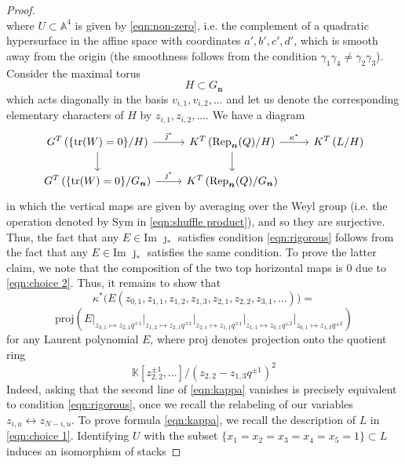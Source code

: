 \documentclass{amsart}
\def\BA{{\mathbb{A}}}
\def\BK{{\mathbb{K}}}
\def\bn{{\boldsymbol{n}}}
\begin{document}
\begin{proof}
\begin{equation}
\end{equation} 
where $U \subset \BA^4$ is given by \eqref{eqn:non-zero}, i.e. the complement of a quadratic hypersurface in the affine space with coordinates $a',b',c',d'$, which is smooth away from the origin (the smoothness follows from the condition $\gamma_1\gamma_4 \neq \gamma_2\gamma_3$). Consider the maximal torus
\[
H \subset G_{\bn}
\]
which acts diagonally in the basis $v_{i,1},v_{i,2},\dots$ and let us denote the corresponding elementary characters of $H$ by $z_{i,1},z_{i,2},\dots$. We have a diagram
\[
\begin{tikzcd}
G^T \left(\{\text{tr}(W) = 0\}/H \right) \arrow[d] \arrow[r,"\bar{\jmath}^*"]  & K^T \left(\text{Rep}_{\bn}(Q)/H \right) \arrow[d] \arrow[r,"\kappa^*"] & K^T \left(L/H \right) \\ 
G^T \left(\{\text{tr}(W) = 0\}/G_{\bn} \right) \arrow[r,"\jmath^*"] & K^T \left(\text{Rep}_{\bn}(Q)/G_{\bn} \right)  & 
\end{tikzcd}
\]
in which the vertical maps are given by averaging over the Weyl group (i.e. the operation denoted by $\text{Sym}$ in \eqref{eqn:shuffle product}), and so they are surjective. Thus, the fact that any $E \in \text{Im }\jmath_*$ satisfies condition \eqref{eqn:rigorous} follows from the fact that any $E \in \text{Im }\bar{\jmath}_*$ satisfies the same condition. To prove the latter claim, we note that the composition of the two top horizontal maps is $0$ due to \eqref{eqn:choice 2}. Thus, it remains to show that
\begin{equation}
\label{eqn:kappa}
\kappa^*\Big(E(z_{0,1},z_{1,1},z_{1,2},z_{1,3},z_{2,1},z_{2,2},z_{3,1},\dots )\Big) = 
\end{equation} 
\[
\text{proj} \left( E\Big|_{z_{3,1} \mapsto z_{2,1}q^{\mp 1}} \Big|_{z_{1,2} \mapsto z_{2,1}q^{\mp 1}} \Big|_{z_{2,1} \mapsto z_{1,1} q^{\mp 1}} \Big|_{z_{1,1} \mapsto z_{0,1} q^{\pm 2}} \Big|_{z_{0,1} \mapsto z_{1,3} q^{\pm 2}} \right)
\]
for any Laurent polynomial $E$, where $\text{proj}$ denotes projection onto the quotient ring
\begin{equation}
\label{eqn:quotient}
\BK[z_{2,2}^{\pm 1},\dots] \Big/ (z_{2,2} - z_{1,3} q^{\pm 1})^2
\end{equation}
Indeed, asking that the second line of \eqref{eqn:kappa} vanishes is precisely equivalent to condition \eqref{eqn:rigorous}, once we recall the relabeling of our variables $z_{i,u} \leftrightarrow z_{N-i,u}$. To prove formula \eqref{eqn:kappa}, we recall the description of $L$ in \eqref{eqn:choice 1}. Identifying $U$ with the subset $\{x_1=x_2=x_3=x_4=x_5=1\} \subset L$ induces an isomorphism of stacks 

\end{proof}
\end{document}
